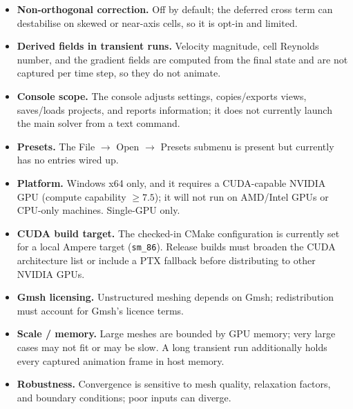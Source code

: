 \documentclass[11pt]{article}
\begin{document}
\begin{itemize}[nosep]
        degenerate rectangles fall back to the rasterised single-block grid.
  \item \textbf{Non-orthogonal correction.} Off by default; the deferred cross term can
        destabilise on skewed or near-axis cells, so it is opt-in and limited.
  \item \textbf{Derived fields in transient runs.} Velocity magnitude, cell Reynolds
        number, and the gradient fields are computed from the final state and are not
        captured per time step, so they do not animate.
  \item \textbf{Console scope.} The console adjusts settings, copies/exports views,
        saves/loads projects, and reports information; it does not currently launch the
        main solver from a text command.
  \item \textbf{Presets.} The File \(\rightarrow\) Open \(\rightarrow\) Presets submenu
        is present but currently has no entries wired up.
  \item \textbf{Platform.} Windows x64 only, and it requires a CUDA-capable NVIDIA GPU
        (compute capability $\geq 7.5$); it will not run on AMD/Intel GPUs or CPU-only
        machines. Single-GPU only.
  \item \textbf{CUDA build target.} The checked-in CMake configuration is currently set
        for a local Ampere target (\texttt{sm\_86}). Release builds must broaden the
        CUDA architecture list or include a PTX fallback before distributing to other
        NVIDIA GPUs.
  \item \textbf{Gmsh licensing.} Unstructured meshing depends on Gmsh; redistribution
        must account for Gmsh's licence terms.
  \item \textbf{Scale / memory.} Large meshes are bounded by GPU memory; very large
        cases may not fit or may be slow. A long transient run additionally holds every
        captured animation frame in host memory.
  \item \textbf{Robustness.} Convergence is sensitive to mesh quality, relaxation
        factors, and boundary conditions; poor inputs can diverge.
\end{itemize}

\end{document}

